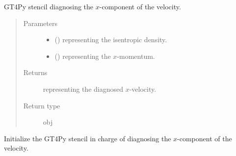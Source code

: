 \documentclass[letterpaper,10pt,english]{sphinxmanual}
\begin{document}
\begin{fulllineitems}
\begin{fulllineitems}
\label{\detokenize{api:tasmania.dycore.diagnostic_isentropic.DiagnosticIsentropic._stencil_diagnosing_velocity_x_defs}}
GT4Py stencil diagnosing the \(x\)-component of the velocity.
\begin{quote}\begin{description}
\item[{Parameters}] \leavevmode\begin{itemize}
\item {} 
 () \textendash{}  representing the isentropic density.

\item {} 
 () \textendash{}  representing the \(x\)-momentum.

\end{itemize}

\item[{Returns}] \leavevmode
{} representing the diagnosed \(x\)-velocity.

\item[{Return type}] \leavevmode
obj

\end{description}\end{quote}

\end{fulllineitems}


\begin{fulllineitems}
\label{\detokenize{api:tasmania.dycore.diagnostic_isentropic.DiagnosticIsentropic._stencil_diagnosing_velocity_x_initialize}}
Initialize the GT4Py stencil in charge of diagnosing the \(x\)-component of the velocity.

\end{fulllineitems}



\end{fulllineitems}
\end{document}
